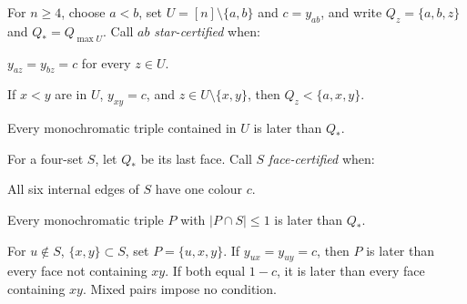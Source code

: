 \documentclass[a4paper,10pt]{amsart}
\theoremstyle{remark}
\begin{document}
For $n\ge4$, choose $a<b$, set $U=[n]\setminus\{a,b\}$ and
$c=y_{ab}$, and write $Q_z=\{a,b,z\}$ and $Q_*=Q_{\max U}$.
Call $ab$ \emph{star-certified} when:
\begin{description}[leftmargin=2.7em,labelwidth=2.3em]
\item[S1.] $y_{az}=y_{bz}=c$ for every $z\in U$.
\item[S2.] If $x<y$ are in $U$, $y_{xy}=c$, and
$z\in U\setminus\{x,y\}$, then $Q_z<\{a,x,y\}$.
\item[S3.] Every monochromatic triple contained in $U$ is later than $Q_*$.
\end{description}
For a four-set $S$, let $Q_*$ be its last face. Call $S$
\emph{face-certified} when:
\begin{description}[leftmargin=2.7em,labelwidth=2.3em]
\item[K1.] All six internal edges of $S$ have one colour $c$.
\item[K2.] Every monochromatic triple $P$ with $|P\cap S|\le1$
is later than $Q_*$.
\item[K3.] For $u\notin S$, $\{x,y\}\subset S$, set $P=\{u,x,y\}$.
If $y_{ux}=y_{uy}=c$, then $P$ is later than every face not containing
$xy$. If both equal $1-c$, it is later than every face containing $xy$.
Mixed pairs impose no condition.
\end{description}
\end{document}
